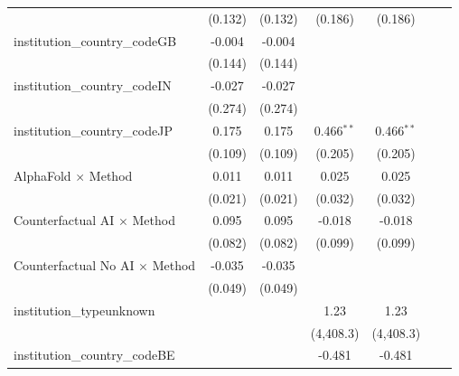 \begin{tabular}{lcccccc}
                                         & (0.132)        & (0.132)        & (0.186)       & (0.186)       &     &   \\   
   institution\_country\_codeGB          & -0.004         & -0.004         &               &               &     &   \\   
                                         & (0.144)        & (0.144)        &               &               &     &   \\   
   institution\_country\_codeIN          & -0.027         & -0.027         &               &               &     &   \\   
                                         & (0.274)        & (0.274)        &               &               &     &   \\   
   institution\_country\_codeJP          & 0.175          & 0.175          & 0.466$^{**}$  & 0.466$^{**}$  &     &   \\   
                                         & (0.109)        & (0.109)        & (0.205)       & (0.205)       &     &   \\   
   AlphaFold $\times$ Method             & 0.011          & 0.011          & 0.025         & 0.025         &     &   \\   
                                         & (0.021)        & (0.021)        & (0.032)       & (0.032)       &     &   \\   
   Counterfactual AI $\times$ Method     & 0.095          & 0.095          & -0.018        & -0.018        &     &   \\   
                                         & (0.082)        & (0.082)        & (0.099)       & (0.099)       &     &   \\   
   Counterfactual No AI $\times$ Method  & -0.035         & -0.035         &               &               &     &   \\   
                                         & (0.049)        & (0.049)        &               &               &     &   \\   
   institution\_typeunknown              &                &                & 1.23          & 1.23          &     &   \\   
                                         &                &                & (4,408.3)     & (4,408.3)     &     &   \\   
   institution\_country\_codeBE          &                &                & -0.481        & -0.481        &     &   \\   

\end{tabular}
